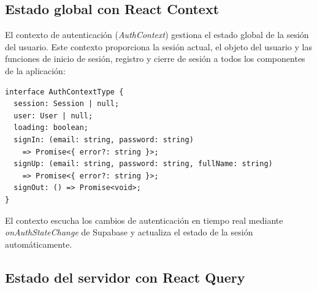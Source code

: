 \begin{table}[H]
  \centering
  \caption{Estrategias de gesti\'on de estado}
\end{table}

\subsection{Estado global con React Context}

El contexto de autenticaci\'on (\textit{AuthContext}) gestiona el estado
global de la sesi\'on del usuario. Este contexto proporciona la sesi\'on actual,
el objeto del usuario y las funciones de inicio de sesi\'on, registro y
cierre de sesi\'on a todos los componentes de la aplicaci\'on:

\begin{lstlisting}
interface AuthContextType {
  session: Session | null;
  user: User | null;
  loading: boolean;
  signIn: (email: string, password: string)
    => Promise<{ error?: string }>;
  signUp: (email: string, password: string, fullName: string)
    => Promise<{ error?: string }>;
  signOut: () => Promise<void>;
}
\end{lstlisting}

El contexto escucha los cambios de autenticaci\'on en tiempo real mediante
\textit{onAuthStateChange} de Supabase y actualiza el estado de la sesi\'on
autom\'aticamente.

\subsection{Estado del servidor con React Query}

